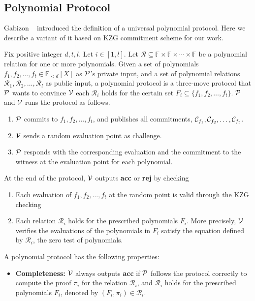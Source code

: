 \subsection{Polynomial Protocol}
Gabizon \etal~\cite{plonk} introduced the definition of a universal polynomial protocol. Here we describe a variant of it based on KZG commitment scheme for our work.
\begin{definition}
Fix positive integer $d,t,l$. Let $i\in[1,l]$. Let $\mathcal{R}\subseteq\mathbb{F}\times\mathbb{F}\times\cdots\times\mathbb{F}$ be a polynomial relation for one or more polynomials. Given a set of polynomials $f_1,f_2,\dots,f_t\in\mathbb{F}_{<d}[X]$ as $\mathcal{P}$'s private input, and a set of polynomial relations $\mathcal{R}_1,\mathcal{R}_2,\dots,\mathcal{R}_l$ as public input, a polynomial protocol is a three-move protocol that $\mathcal{P}$ wants to convince $\mathcal{V}$ each $\mathcal{R}_i$ holds for the certain set $F_i\subseteq\{f_1,f_2,\dots,f_t\}$. $\mathcal{P}$ and $\mathcal{V}$ runs the protocol as follows.
\begin{enumerate}
    \item $\mathcal{P}$ commits to $f_1,f_2,\dots,f_t$, and publishes all commitments, $\mathcal{C}_{f_1},\mathcal{C}_{f_2},\dots,\mathcal{C}_{f_t}$.
    \item $\mathcal{V}$ sends a random evaluation point as challenge.
    \item $\mathcal{P}$ responds with the corresponding evaluation and the commitment to the witness at the evaluation point for each polynomial.
\end{enumerate}
At the end of the protocol, $\mathcal{V}$ outputs \textbf{acc} or \textbf{rej} by checking
\begin{enumerate}
    \item Each evaluation of $f_1,f_2,\dots,f_t$ at the random point is valid through the KZG checking
    \item Each relation $\mathcal{R}_i$ holds for the prescribed polynomials $F_i$. More precisely, $\mathcal{V}$ verifies the evaluations of the polynomials in $F_i$ satisfy the equation defined by $\mathcal{R}_i$, \ie the zero test of polynomials.
\end{enumerate}
A polynomial protocol has the following properties:
\begin{itemize}
    \item \textbf{Completeness:} $\mathcal{V}$ always outputs \textbf{acc} if $\mathcal{P}$ follows the protocol correctly to compute the proof $\pi_i$ for the relation $\mathcal{R}_i$, and $\mathcal{R}_i$ holds for the prescribed polynomials $F_i$, denoted by $(F_i,\pi_i)\in\mathcal{R}_i$.

\end{itemize}
\end{definition}
